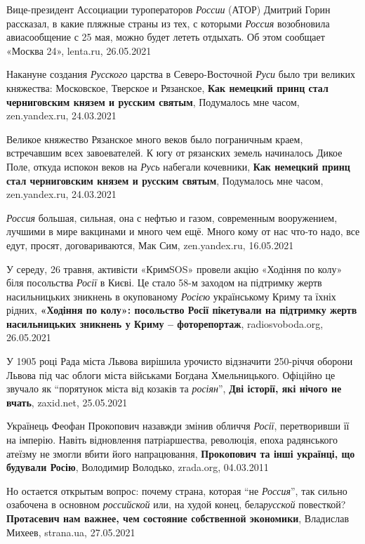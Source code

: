 Вице-президент Ассоциации туроператоров \emph{России} (АТОР) Дмитрий Горин
рассказал, в какие пляжные страны из тех, с которыми \emph{Россия} возобновила
авиасообщение с 25 мая, можно будет лететь отдыхать. Об этом сообщает «Москва
24», lenta.ru, 26.05.2021

Накануне создания \emph{Русского} царства в Северо-Восточной \emph{Руси} было
три великих княжества: Московское, Тверское и Рязанское, \textbf{Как немецкий
принц стал черниговским князем и русским святым}, Подумалось мне часом,
zen.yandex.ru, 24.03.2021

Великое княжество Рязанское много веков было пограничным краем, встречавшим
всех завоевателей. К югу от рязанских земель начиналось Дикое Поле, откуда
испокон веков на \emph{Русь} набегали кочевники, \textbf{Как немецкий принц
стал черниговским князем и русским святым}, Подумалось мне часом,
zen.yandex.ru, 24.03.2021

\emph{Россия} большая, сильная, она с нефтью и газом, современным вооружением,
лучшими в мире вакцинами и много чем ещё. Много кому от нас что-то надо, все
едут, просят, договариваются, Мак Сим, zen.yandex.ru, 16.05.2021

У середу, 26 травня, активісти «КримSOS» провели акцію «Ходіння по колу» біля
посольства \emph{Росії} в Києві. Це стало 58-м заходом на підтримку жертв
насильницьких зникнень в окупованому \emph{Росією} українському Криму та їхніх рідних,
\textbf{«Ходіння по колу»: посольство Росії пікетували на підтримку жертв насильницьких зникнень у Криму – фоторепортаж},
radiosvoboda.org, 26.05.2021

У 1905 році Рада міста Львова вирішила урочисто відзначити 250-річчя оборони
Львова під час облоги міста військами Богдана Хмельницького. Офіційно це
звучало як \enquote{порятунок міста від козаків та \emph{росіян}}, \textbf{Дві
історії, які нічого не вчать}, zaxid.net, 25.05.2021

Українець Феофан Прокопович назавжди змінив обличчя \emph{Росії}, перетворивши
її на імперію. Навіть відновлення патріаршества, революція, епоха радянського
атеїзму не змогли вбити його напрацювання, \textbf{Прокопович та інші українці,
що будували Росію}, Володимир Володько, zrada.org, 04.03.2011

Но остается открытым вопрос: почему страна, которая \enquote{не \emph{Россия}},
так сильно озабочена в основном \emph{российской} или, на худой конец,
бела\emph{русской} повесткой?
\textbf{Протасевич нам важнее, чем состояние собственной экономики}, Владислав Михеев, 
strana.ua, 27.05.2021

